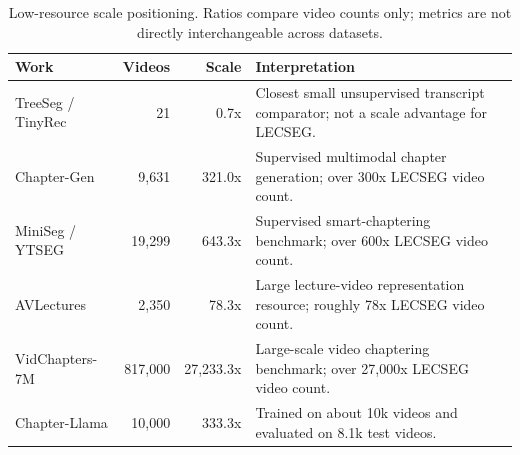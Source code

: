\begin{table}[t]
\centering
\small
\caption{Low-resource scale positioning. Ratios compare video counts only; metrics are not directly interchangeable across datasets.}
\label{tab:low_resource_positioning}
\begin{tabularx}{\linewidth}{lrrX}
\toprule
Work & Videos & Scale & Interpretation \\
\midrule
TreeSeg / TinyRec & 21 & 0.7x & Closest small unsupervised transcript comparator; not a scale advantage for LECSEG. \\
Chapter-Gen & 9,631 & 321.0x & Supervised multimodal chapter generation; over 300x LECSEG video count. \\
MiniSeg / YTSEG & 19,299 & 643.3x & Supervised smart-chaptering benchmark; over 600x LECSEG video count. \\
AVLectures & 2,350 & 78.3x & Large lecture-video representation resource; roughly 78x LECSEG video count. \\
VidChapters-7M & 817,000 & 27,233.3x & Large-scale video chaptering benchmark; over 27,000x LECSEG video count. \\
Chapter-Llama & 10,000 & 333.3x & Trained on about 10k videos and evaluated on 8.1k test videos. \\
\bottomrule
\end{tabularx}
\end{table}